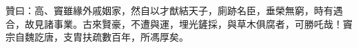\begin{pinyinscope}
 贊曰：高、竇雖緣外戚姻家，然自以才猷結天子，廁跡名臣，垂榮無窮，時有遇合，故見諸事業。古來賢豪，不遭與運，埋光鏟採，與草木俱腐者，可勝吒哉！竇宗自魏訖唐，支胄扶疏數百年，所馮厚矣。



\end{pinyinscope}